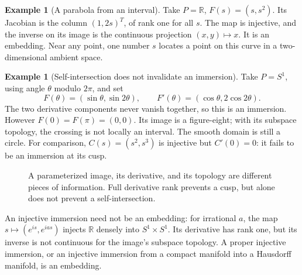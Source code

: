 \documentclass[11pt,a4paper]{article}
\numberwithin{equation}{section}
\theoremstyle{definition}
\newtheorem{example}[definition]{Example}
\theoremstyle{plain}
\theoremstyle{remark}
\newcommand{\R}{\mathbb R}
\begin{document}
\begin{example}[A parabola from an interval]
Take $P=\R$, $F(s)=(s,s^2)$. Its Jacobian is the column $(1,2s)^T$, of rank one for all $s$. The map is injective, and the inverse on its image is the continuous projection $(x,y)\mapsto x$. It is an embedding. Near any point, one number $s$ locates a point on this curve in a two-dimensional ambient space.
\end{example}

\begin{example}[Self-intersection does not invalidate an immersion]
Take $P=S^1$, using angle $\theta$ modulo $2\pi$, and set
\[
F(\theta)=(\sin\theta,\sin2\theta),\qquad F'(\theta)=(\cos\theta,2\cos2\theta).
\]
The two derivative components never vanish together, so this is an immersion. However $F(0)=F(\pi)=(0,0)$. Its image is a figure-eight; with its subspace topology, the crossing is not locally an interval. The smooth domain is still a circle. For comparison, $C(s)=(s^2,s^3)$ is injective but $C'(0)=0$: it fails to be an immersion at its cusp.
\end{example}

\begin{figure}[htbp]\centering
{}
\caption{A parameterized image, its derivative, and its topology are different pieces of information. Full derivative rank prevents a cusp, but alone does not prevent a self-intersection.}
\end{figure}
An injective immersion need not be an embedding: for irrational $a$, the map $s\mapsto(e^{is},e^{ias})$ injects $\R$ densely into $S^1\times S^1$. Its derivative has rank one, but its inverse is not continuous for the image's subspace topology. A proper injective immersion, or an injective immersion from a compact manifold into a Hausdorff manifold, is an embedding.
\end{document}
